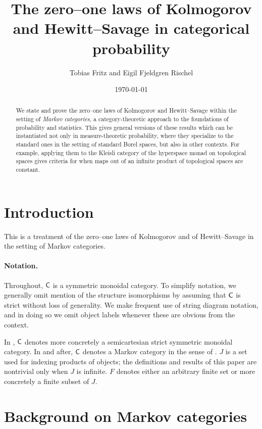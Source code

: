 \documentclass[11pt]{article}
\author{Tobias Fritz and Eigil Fjeldgren Rischel}
\title{The zero--one laws of Kolmogorov and Hewitt--Savage in categorical probability}
\date{\today}
\begin{document}
\maketitle

\begin{abstract}
	We state and prove the zero--one laws of Kolmogorov and Hewitt--Savage within the setting of \emph{Markov categories}, a category-theoretic approach to the foundations of probability and statistics. This gives general versions of these results which can be instantiated not only in measure-theoretic probability, where they specialize to the standard ones in the setting of standard Borel spaces, but also in other contexts. For example, applying them to the Kleisli category of the hyperspace monad on topological spaces gives criteria for when maps out of an infinite product of topological spaces are constant.
\end{abstract}

\tableofcontents

\section{Introduction}

This is a treatment of the zero--one laws of Kolmogorov and of Hewitt--Savage in the setting of Markov categories.

\paragraph*{Notation.} 

Throughout, $\mathsf{C}$ is a symmetric monoidal category. To simplify notation, we generally omit mention of the structure isomorphisms by assuming that $\mathsf{C}$ is strict without loss of generality. We make frequent use of string diagram notation, and in doing so we omit object labels whenever these are obvious from the context.

In , $\mathsf{C}$ denotes more concretely a semicartesian strict symmetric monoidal category. In  and after, $\mathsf{C}$ denotes a Markov category in the sense of . $J$ is a set used for indexing products of objects; the definitions and results of this paper are nontrivial only when $J$ is infinite. $F$ denotes either an arbitrary finite set or more concretely a finite subset of $J$.

\section{Background on Markov categories}
\end{document}
